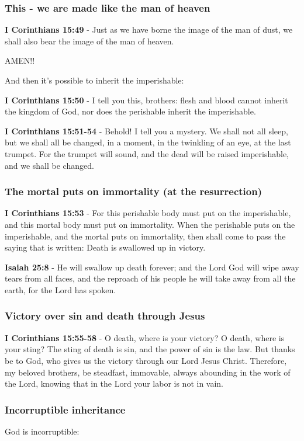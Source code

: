\documentclass[11pt]{article}
\begin{document}
\subsubsection{This - we are made like the man of heaven}
\label{sec:org438aa32}
\textbf{I Corinthians 15:49} - Just as we have borne the image of the man of dust, we shall also bear the image of the man of heaven.

AMEN!!

And then it's possible to inherit the imperishable:

\textbf{I Corinthians 15:50} - I tell you this, brothers: flesh and blood cannot inherit the kingdom of God, nor does the perishable inherit the imperishable.

\textbf{I Corinthians 15:51-54} - Behold! I tell you a mystery. We shall not all sleep, but we shall all be changed, in a moment, in the twinkling of an eye, at the last trumpet. For the trumpet will sound, and the dead will be raised imperishable, and we shall be changed.

\subsubsection{The mortal puts on immortality (at the resurrection)}
\label{sec:org8cc2fd0}
\textbf{I Corinthians 15:53} - For this perishable body must put on the imperishable, and this mortal body must put on immortality. When the perishable puts on the imperishable, and the mortal puts on immortality, then shall come to pass the saying that is written: Death is swallowed up in victory.

\textbf{Isaiah 25:8} - He will swallow up death forever; and the Lord God will wipe away tears from all faces, and the reproach of his people he will take away from all the earth, for the Lord has spoken.

\subsubsection{Victory over sin and death through Jesus}
\label{sec:org289d749}
\textbf{I Corinthians 15:55-58} - O death, where is your victory? O death, where is your sting?  The sting of death is sin, and the power of sin is the law.  But thanks be to God, who gives us the victory through our Lord Jesus Christ.  Therefore, my beloved brothers, be steadfast, immovable, always abounding in the work of the Lord, knowing that in the Lord your labor is not in vain.

\subsubsection{Incorruptible inheritance}
\label{sec:org4578aa4}
God is incorruptible:
\end{document}
